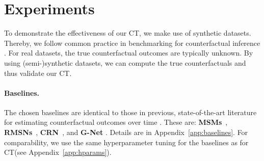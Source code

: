 \documentclass{article}
\theoremstyle{plain}
\theoremstyle{definition}
\theoremstyle{remark}
\newcommand{\shortname}{CT\xspace}
\begin{document}
\begin{table}[tbp]
    \caption{Ablation study for proposed \shortname (with CDC loss, $\alpha = 0.01$, $\beta = 0.99$). Reported: normalized RMSE of \shortname with relative changes.}
    \label{tab:ablation-study}
    \begin{center}
        \scriptsize
        \addtolength{\tabcolsep}{-1.6pt}  
        
        \addtolength{\tabcolsep}{1.6pt}  
    \end{center}
    \vskip -0.29in
\end{table}

\begin{table}[tp]
    \vskip -0.075in
    \caption{CRN with different training procedures. Results for fully-synthetic data based on tumor growth simulator (here: $\gamma = 4$).}
    \label{tab:ablation-study-crn}
    \begin{center}
        \scriptsize
        
    \end{center}
    \vskip -0.25in
\end{table}

\section{Experiments}

To demonstrate the effectiveness of our \shortname, we make use of synthetic datasets. Thereby, we follow common practice in benchmarking for counterfactual inference \cite{lim2018forecasting,bica2020estimating,li2021g}. For real datasets, the true counterfactual outcomes are typically unknown. By using \mbox{(semi-)}synthetic datasets, we can compute the true counterfactuals and thus validate our \shortname.    

\paragraph{Baselines.} The chosen baselines are identical to those in previous, state-of-the-art literature for estimating counterfactual outcomes over time \cite{lim2018forecasting,bica2020estimating,li2021g}. These are: \textbf{MSMs}~\cite{robins2000marginal,hernan2001marginal}, \textbf{RMSNs}~\cite{lim2018forecasting}, \textbf{CRN}~\cite{bica2020estimating}, and \textbf{G-Net} \cite{li2021g}. Details are in Appendix~\ref{app:baselines}. For comparability, we use the same hyperparameter tuning for the baselines as for \shortname (see Appendix~\ref{app:hparams}). 
\end{document}
